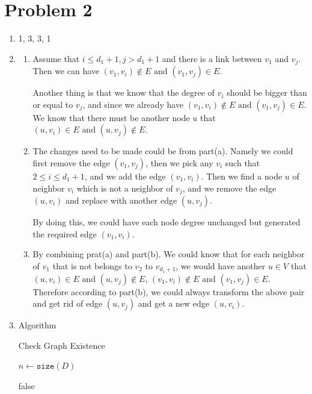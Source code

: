 \documentclass{article} %
\begin{document}
\newpage
\section*{Problem 2}
\begin{enumerate}
\item 1, 3, 3, 1
\item
	\begin{enumerate}
	\item 
    	Assume that $i \leq d_1 + 1, j > d_1 + 1$ and there is a link between $v_1$ and $v_j$. Then we can have $(v_1, v_i) \notin E \text{ and } (v_1, v_j) \in E$.

		Another thing is that we know that the degree of $v_i$ should be bigger than or equal to $v_j$, and since we already have $(v_1, v_i) \notin E \text{ and } (v_1, v_j) \in E$. We know that there must be another node $u$ that $(u, v_i) \in E \text{ and } (u, v_j) \notin E$.

	\item 
    	The changes need to be made could be from part(a). Namely we could first remove the edge $(v_1, v_j)$, then we pick any $v_i$ such that $2 \leq i \leq d_1+1$, and we add the edge $(v_1, v_i)$. Then we find a node $u$ of neighbor $v_i$ which is not a neighbor of $v_j$, and we remove the edge $(u, v_i)$ and replace with another edge $(u, v_j)$.
    
    	By doing this, we could have each node degree unchanged but generated the required edge $(v_1, v_i)$.

  	\item 
    	By combining prat(a) and part(b). We could know that for each neighbor of $v_1$ that is not belongs to $v_2 \text{ to } v_{d_1+1}$, we would have another $u \in V$ that $(u, v_i) \in E \text{ and } (u, v_j) \notin E$, $(v_1, v_i) \notin E \text{ and } (v_1, v_j) \in E$. Therefore according to part(b), we could always transform the above pair and get rid of edge $(u, v_j)$ and get a new edge $(u, v_i)$.

  	\end{enumerate}

\item 
	Algorithm
    \begin{algorithm}
    \caption{Check Graph Existence}
    \label{graphalgo}
    \begin{algorithmic}[1]
     {}
    \State $n \gets \mathtt{size}(D)$

       \Return false
      \EndIf
    \EndFor


\end{algorithmic}
\end{algorithm}
\end{enumerate}
\end{document}
